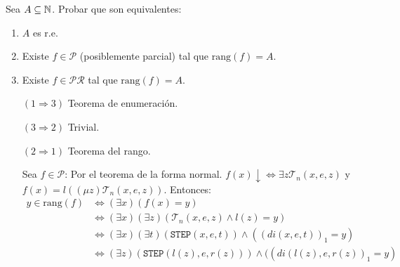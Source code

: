 \documentclass[twoside]{article}
\begin{document}
\begin{ejercicio}{5}
Sea $A \subseteq \mathbb{N}$. Probar que son equivalentes:
\begin{enumerate}
	\item $A$ es r.e.
	\item Existe $f \in \mathcal{P}$ (posiblemente parcial) tal que $\text{rang}(f) = A$.
	\item Existe $f \in \mathcal{P}\mathcal{R}$ tal que $\text{rang}(f)=A$.
\end{enumerate}
\end{ejercicio}
\begin{solucion}\mbox{}
\begin{itemize}
	\item[$(1\Rightarrow 3)$] Teorema de enumeración.
	\item[$(3\Rightarrow 2)$] Trivial.
	\item[$(2\Rightarrow 1)$] Teorema del rango.
	
	Sea $f \in \mathcal{P}$: Por el teorema de la forma normal. $f(x)\!\downarrow \Leftrightarrow \exists z \mathcal{T}_n(x,e,z)$ y $f(x) = l((μz)\mathcal{T}_n(x,e,z))$.
	Entonces:
	\begin{align*}
	y \in \text{rang}(f) & \Leftrightarrow (\exists x) (f(x)=y)\\
	& \Leftrightarrow (\exists x)(\exists z) (\mathcal{T}_n(x,e,z) \land l(z) = y)\\
	& \Leftrightarrow (\exists x) (\exists t) (\texttt{STEP}(x,e,t)) \land ((di(x,e,t))_1 = y)\\
	& \Leftrightarrow (\exists z) (\texttt{STEP}(l(z),e,r(z))) \land ((di(l(z),e,r(z))_1 = y)
\end{align*}
\end{itemize}
\end{solucion}

\newpage
\end{document}
